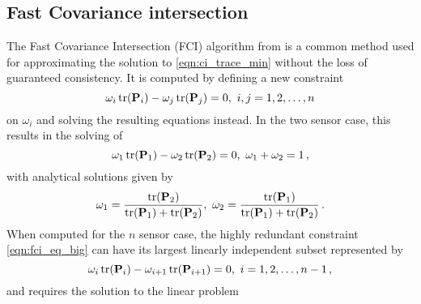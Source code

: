 \documentclass[letterpaper, 10 pt, conference]{ieeeconf}  %
\begin{document}
\subsection{Fast Covariance intersection}
The Fast Covariance Intersection (FCI) algorithm from \cite{niehsenInformationFusionBased2002} is a common method used for approximating the solution to \eqref{eqn:ci_trace_min} without the loss of guaranteed consistency. It is computed by defining a new constraint
\begin{equation}
   \omega_i \operatorname{tr}({{\mathbf{P}}}_i) - \omega_j \operatorname{tr}({{\mathbf{P}}}_j) = 0,\ i,j=1,2,\dots,n \label{eqn:fci_eq_big}
\end{equation}
on $\omega_i$ and solving the resulting equations instead. In the two sensor case, this results in the solving of
\begin{equation}
   \omega_1 \operatorname{tr}({{\mathbf{P}}}_1) - \omega_2 \operatorname{tr}({{\mathbf{P}}}_2) = 0,\ \omega_1 + \omega_2 = 1\,, \label{eqn:fci_2sen_omega_sum_eq}
\end{equation}
with analytical solutions given by
\begin{equation}
   \omega_1 = \frac{\operatorname{tr}({{\mathbf{P}}}_2)}{\operatorname{tr}({{\mathbf{P}}}_1)+\operatorname{tr}({{\mathbf{P}}}_2)},\ \omega_2 = \frac{\operatorname{tr}({{\mathbf{P}}}_1)}{\operatorname{tr}({{\mathbf{P}}}_1)+\operatorname{tr}({{\mathbf{P}}}_2)}\,. \label{eqn:fci_2sen_sol}
\end{equation}
When computed for the $n$ sensor case, the highly redundant constraint \eqref{eqn:fci_eq_big} can have its largest linearly independent subset represented by
\begin{equation}
   \omega_i \operatorname{tr}({{\mathbf{P}}}_i) - \omega_{i+1} \operatorname{tr}({{\mathbf{P}}}_{i+1}) = 0,\ i=1,2,\dots,n-1\,, \label{eqn:fci_eq}
\end{equation}
and requires the solution to the linear problem
\end{document}
